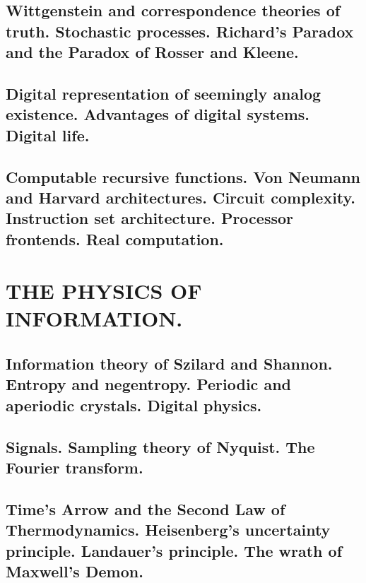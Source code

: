 \documentclass[letterpaper,draft]{memoir}
\begin{document}
\chapter{Wittgenstein and correspondence theories of truth. Stochastic processes.
Richard's Paradox and the Paradox of Rosser and Kleene.}

\chapter{Digital representation of seemingly analog existence. Advantages of digital
systems. Digital life.}

\chapter{Computable recursive functions. Von Neumann and Harvard architectures.
Circuit complexity. Instruction set architecture. Processor frontends. Real computation.}

\part{THE PHYSICS OF INFORMATION.}


\chapter{Information theory of Szilard and Shannon. Entropy and negentropy. Periodic
and aperiodic crystals. Digital physics.}

\chapter{Signals. Sampling theory of Nyquist. The Fourier transform.}

\chapter{Time's Arrow and the Second Law of Thermodynamics. Heisenberg's uncertainty
principle. Landauer's principle. The wrath of Maxwell's Demon.}
\end{document}
